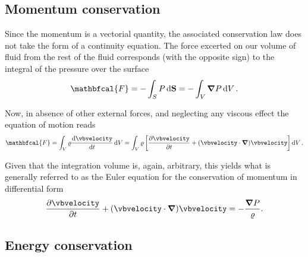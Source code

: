 \subsection{Momentum conservation}\label{sec:nrf_momentum_conservation}

Since the momentum is a vectorial quantity, the associated conservation law does
not take the form of a continuity equation.
The force excerted on our volume of fluid from the rest of the fluid corresponds
(with the opposite sign) to the integral of the pressure over the surface 
\begin{align*}
  \mathbfcal{F} = -\int_S \pressure \dd{\vb{S}} = -\int_V \vnabla \pressure \dd{V}.
\end{align*}

Now, in absence of other external forces, and neglecting any viscous effect
the equation of motion reads
\begin{align*}
  \mathbfcal{F} = %
  \int_V \density  \dv{\vbvelocity}{t} \dd{V} =
  \int_V \density \left[\pdv{\vbvelocity}{t} +
  (\vbvelocity \cdot \vnabla) \vbvelocity
  \right] \dd{V}.
\end{align*}

Given that the integration volume is, again, arbitrary, this yields what is generally
referred to as the Euler equation for the conservation of momentum in differential
form
\begin{align}\label{eq:euler_equation}
  \pdv{\vbvelocity}{t} + (\vbvelocity \cdot \grad) \vbvelocity =
  -\frac{\grad{\pressure}}{\density}.
\end{align}



\subsection{Energy conservation}\label{sec:nrf_energy_conservation}

